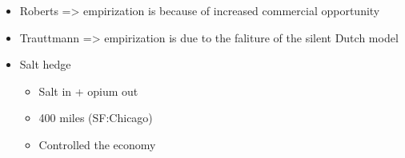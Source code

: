 \documentclass[letterpaper]{article}
\begin{document}
\begin{itemize}
\item Roberts => empirization is because of increased commercial opportunity

\item Trauttmann => empirization is due to the faliture of the silent Dutch
model

\item Salt hedge

\begin{itemize}
\item Salt in + opium out
\item 400 miles (SF:Chicago)
\item Controlled the economy
\end{itemize}
\end{itemize}
\end{document}
